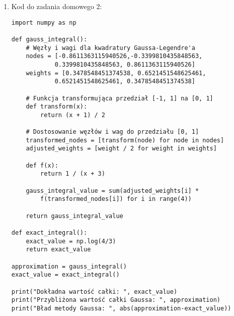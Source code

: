 \documentclass[10pt]{article}
\begin{document}
\begin{adjustwidth}{-1.5cm}{-1.5cm}
\begin{enumerate}
\begin{verbatim}
rectangle_result = rectangle_method(f, a, b, h) 
adaptive_result = adaptive_quadrature(f, a, b, epsilon)
print("Dokładna wartość całki: ", np.arctan(1)) 
print("Wynik metody prostokątów: ", rectangle_result) 
print("Błąd metody prostokątów: ", np.abs(rectangle_result - np.arctan(1)))
print("Wynik adaptacyjnej metody kwadratowej: ", adaptive_result) 
print("Błąd adaptacyjnej metody kwadratowej: ", np.abs(adaptive_result - np.arctan(1)))

\end{verbatim}
\newpage
\item Kod do zadania domowego 2:

\begin{verbatim}
import numpy as np

def gauss_integral():
    # Węzły i wagi dla kwadratury Gaussa-Legendre'a
    nodes = [-0.8611363115940526,-0.3399810435848563, 
            0.3399810435848563, 0.8611363115940526]
    weights = [0.3478548451374538, 0.6521451548625461,
            0.6521451548625461, 0.3478548451374538]
    
    # Funkcja transformująca przedział [-1, 1] na [0, 1]
    def transform(x):
        return (x + 1) / 2
    
    # Dostosowanie węzłów i wag do przedziału [0, 1]
    transformed_nodes = [transform(node) for node in nodes]
    adjusted_weights = [weight / 2 for weight in weights]
    
    def f(x):
        return 1 / (x + 3)
    
    gauss_integral_value = sum(adjusted_weights[i] * 
        f(transformed_nodes[i]) for i in range(4))
    
    return gauss_integral_value
    
def exact_integral():
    exact_value = np.log(4/3)
    return exact_value
    
approximation = gauss_integral()
exact_value = exact_integral()
    
print("Dokładna wartość całki: ", exact_value)
print("Przybliżona wartość całki Gaussa: ", approximation)
print("Bład metody Gaussa: ", abs(approximation-exact_value))
\end{verbatim}

\end{enumerate}
\end{adjustwidth}
\end{document}
